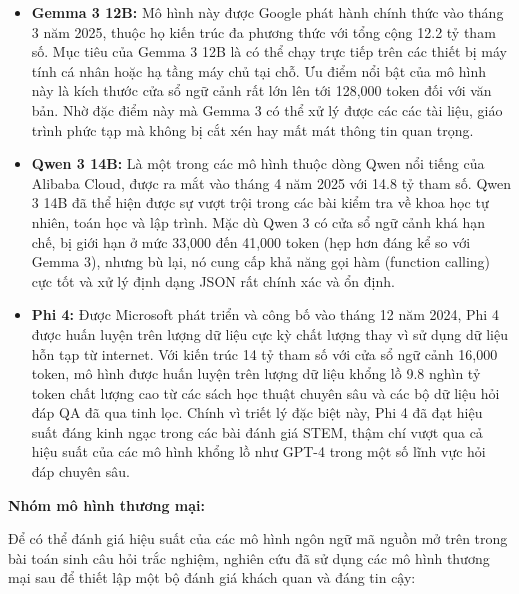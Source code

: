 \begin{itemize}
    \item \textbf{Gemma 3 12B:} Mô hình này được Google phát hành chính thức vào tháng 3 năm 2025, thuộc họ kiến trúc đa phương thức với tổng cộng 12.2 tỷ tham số. Mục tiêu của Gemma 3 12B là có thể chạy trực tiếp trên các thiết bị máy tính cá nhân hoặc hạ tầng máy chủ tại chỗ. Ưu điểm nổi bật của mô hình này là kích thước cửa sổ ngữ cảnh rất lớn lên tới 128,000 token đối với văn bản. Nhờ đặc điểm này mà Gemma 3 có thể xử lý được các các tài liệu, giáo trình phức tạp mà không bị cắt xén hay mất mát thông tin quan trọng. 
    \item \textbf{Qwen 3 14B:} Là một trong các mô hình thuộc dòng Qwen nổi tiếng của Alibaba Cloud, được ra mắt vào tháng 4 năm 2025 với 14.8 tỷ tham số.  Qwen 3 14B đã thể hiện được sự vượt trội trong các bài kiểm tra về khoa học tự nhiên, toán học và lập trình. Mặc dù Qwen 3 có cửa sổ ngữ cảnh khá hạn chế, bị giới hạn ở mức 33,000 đến 41,000 token (hẹp hơn đáng kể so với Gemma 3), nhưng bù lại, nó cung cấp khả năng gọi hàm (function calling) cực tốt và xử lý định dạng JSON rất chính xác và ổn định.
    \item \textbf{Phi 4:} Được Microsoft phát triển và công bố vào tháng 12 năm 2024, Phi 4 được huấn luyện trên lượng dữ liệu cực kỳ chất lượng thay vì sử dụng dữ liệu hỗn tạp từ internet. Với kiến trúc 14 tỷ tham số với cửa sổ ngữ cảnh 16,000 token, mô hình được huấn luyện trên lượng dữ liệu khổng lồ 9.8 nghìn tỷ token chất lượng cao từ các sách học thuật chuyên sâu và các bộ dữ liệu hỏi đáp QA đã qua tinh lọc. Chính vì triết lý đặc biệt này, Phi 4 đã đạt hiệu suất đáng kinh ngạc trong các bài đánh giá STEM, thậm chí vượt qua cả hiệu suất của các mô hình khổng lồ như GPT-4 trong một số lĩnh vực hỏi đáp chuyên sâu.
\end{itemize}

\textbf{Nhóm mô hình thương mại:}

Để có thể đánh giá hiệu suất của các mô hình ngôn ngữ mã nguồn mở trên trong bài toán sinh câu hỏi trắc nghiệm, nghiên cứu đã sử dụng các mô hình thương mại sau để thiết lập một bộ đánh giá khách quan và đáng tin cậy:

